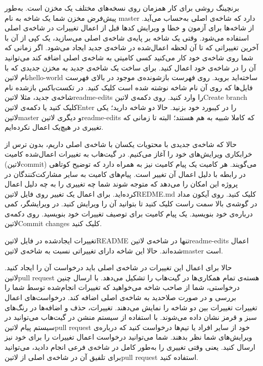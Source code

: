 برنچینگ روشی برای کار همزمان روی نسخه‌های مختلف یک مخزن است.
به‌طور پیش‌فرض مخزن شما یک شاخه به نام master دارد که شاخه‌ی اصلی به‌حساب می‌آید. از شاخه‌ها برای آزمون و خطا و ویرایش کدها قبل از اعمال تغییرات در شاخه‌ی اصلی استفاده می‌شود.
وقتی یک شاخه بر پایه‌ی شاخه‌ی اصلی می‌سازید، یک کپی از آن با آخرین تغییراتی که تا آن لحظه اعمال‌شده در شاخه‌ی جدید ایجاد می‌شود. اگر زمانی که شما روی شاخه‌ی خود کار می‌کنید کسی کامیتی به شاخه‌ی اصلی اضافه کند می‌توانید آن را در شاخه‌ی خود اعمال کنید.
برای ساخت یک شاخه‌ی جدید به مخزن جدیدی که با نام ‌لاتین{hello-world} ساخته‌اید بروید.
روی فهرست بازشونده‌ی موجود در بالای فهرست فایل‌ها که روی آن نام شاخه نوشته شده است کلیک کنید. در تکست‌باکس بازشده نام شاخه‌ی جدید، مثلا ‌لاتین{readme-edits} را وارد کنید.
روی دکمه‌ی ‌لاتین{Create branch} کلیک کنید یا دکمه‌ی ‌لاتین{Enter} را در کیبورد خود بزنید. حالا دو شاخه دارید؛ یکی ‌لاتین{master} و دیگری ‌لاتین{readme-edits} که کاملا شبیه به هم هستند؛ البته تا زمانی که تغییری در هیچ‌یک اعمال نکرده‌ایم.

حالا که شاخه‌ی جدیدی با محتویات یکسان با شاخه‌ی اصلی داریم، بدون ترس از خرابکاری ویرایش‌های خود را آغاز می‌کنیم.
در گیت‌هاب به تغییرات اعمال‌شده کامیت (‌لاتین{commit}) می‌گویند. هر کامیت یک پیام کامیت نیز به همراه دارد که توضیح کوتاهی در رابطه با دلیل اعمال آن تغییر است. پیام‌های کامیت به سایر مشارکت‌کنندگان در پروژه این امکان را می‌دهد که متوجه شوند شما چه تغییری را به چه دلیل اعمال کرده‌اید.
برای اعمال یک تغییر روی فایل ‌لاتین{REDME.md} کلیک کنید.
روی آیکون مداد در گوشه‌ی بالا سمت راست کلیک کنید تا بتوانید آن را ویرایش کنید.
در ویرایشگر، کمی درباره‌ی خود بنویسید.
یک پیام کامیت برای توصیف تغییرات خود بنویسید.
روی دکمه‌ی ‌لاتین{Commit changes} کلیک کنید.


تغییرات ایجادشده در فایل ‌لاتین{README} تنها در شاخه‌ی ‌لاتین{readme-edits} اعمال‌ شده‌اند. حالا این شاخه دارای تغییراتی نسبت به شاخه‌ی ‌لاتین{master} است.

حالا برای اعمال این تغییرات در شاخه‌ی اصلی باید درخواست آن را ایجاد کنید. ‌لاتین{pull request} هسته‌ی تمام همکاری‌ها در گیت‌هاب را تشکیل می‌دهد. با ارسال چنین درخواستی، شما از صاحب شاخه می‌خواهید که تغییرات انجام‌شده توسط شما را بررسی و در صورت صلاحدید به شاخه‌ی اصلی اضافه کند. درخواست‌های اعمال تغییرات تغییرات بین دو شاخه را نمایش می‌دهند. تغییرات، حذف و اضافه‌ها در رنگ‌های سبز و قرمز نشان داده می‌شوند.
با استفاده از سیستم منشن در گیت‌هاب می‌توانید در سیستم پیام‌ ‌لاتین{pull request} خود از سایر افراد یا تیم‌ها درخواست کنید که درباره‌ی ویرایش‌های شما نظر بدهند.
شما می‌توانید درخواست اعمال تغییرات را برای خود نیز ارسال کنید. یعنی وقتی تغییری را به‌طور کامل در شاخه‌ی فرعی انجام دادید، می‌توانید برای تلفیق آن در شاخه‌ی اصلی از ‌لاتین{pull request} استفاده کنید.

